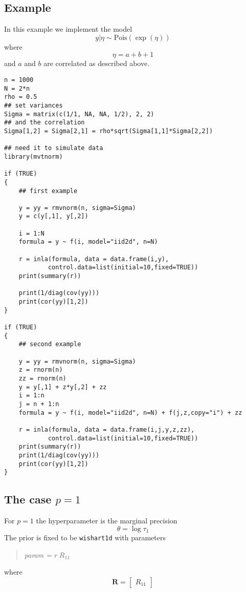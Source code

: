 \documentclass[a4paper,11pt]{article}
\begin{document}
\subsection*{Example}
In this example we implement the model
\begin{displaymath}
    y|\eta\sim\mbox{Pois}(\exp(\eta))
\end{displaymath}
where
\begin{displaymath}
    \eta=a+b+1
\end{displaymath}
and $a$ and $b$ are correlated as described above.

\begin{verbatim}
n = 1000
N = 2*n
rho = 0.5
## set variances
Sigma = matrix(c(1/1, NA, NA, 1/2), 2, 2)
## and the correlation
Sigma[1,2] = Sigma[2,1] = rho*sqrt(Sigma[1,1]*Sigma[2,2])

## need it to simulate data
library(mvtnorm)

if (TRUE)
{
    ## first example
    
    y = yy = rmvnorm(n, sigma=Sigma)
    y = c(y[,1], y[,2])

    i = 1:N
    formula = y ~ f(i, model="iid2d", n=N)

    r = inla(formula, data = data.frame(i,y),
            control.data=list(initial=10,fixed=TRUE))
    print(summary(r))

    print(1/diag(cov(yy)))
    print(cor(yy)[1,2])
}

if (TRUE)
{
    ## second example

    y = yy = rmvnorm(n, sigma=Sigma)
    z = rnorm(n)
    zz = rnorm(n)
    y = y[,1] + z*y[,2] + zz
    i = 1:n
    j = n + 1:n
    formula = y ~ f(i, model="iid2d", n=N) + f(j,z,copy="i") + zz 

    r = inla(formula, data = data.frame(i,j,y,z,zz),
            control.data=list(initial=10,fixed=TRUE))
    print(summary(r))
    print(1/diag(cov(yy)))
    print(cor(yy)[1,2])
}
\end{verbatim}

\subsection*{The case $p=1$}

For $p=1$ the
hyperparameter is the marginal precision
\begin{displaymath}
    \theta = \log \tau_{1}
\end{displaymath}
The prior is fixed to be \texttt{wishart1d} with parameters
\begin{quote}
    \emph{param = } $r\;R_{11}$
\end{quote}
where
\begin{displaymath}
    \mathbf{R} =
    \left[\begin{array}{c}
        R_{11}
    \end{array}\right]
\end{displaymath}
\end{document}
